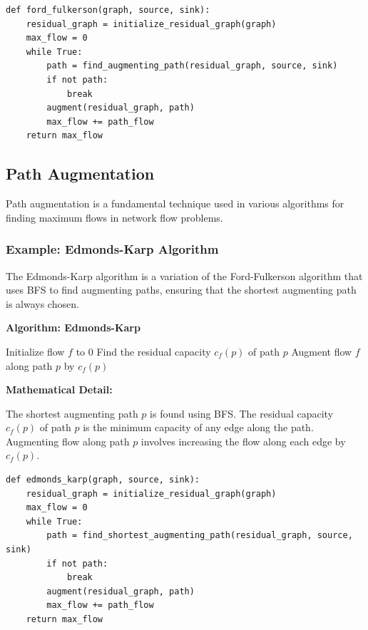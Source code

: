 \documentclass[12pt]{book} %
\begin{document}
\FloatBarrier
\begin{lstlisting}
def ford_fulkerson(graph, source, sink):
    residual_graph = initialize_residual_graph(graph)
    max_flow = 0
    while True:
        path = find_augmenting_path(residual_graph, source, sink)
        if not path:
            break
        augment(residual_graph, path)
        max_flow += path_flow
    return max_flow
\end{lstlisting}
\FloatBarrier

\subsection{Path Augmentation}

Path augmentation is a fundamental technique used in various algorithms for finding maximum flows in network flow problems.

\subsubsection{Example: Edmonds-Karp Algorithm}

The Edmonds-Karp algorithm is a variation of the Ford-Fulkerson algorithm that uses BFS to find augmenting paths, ensuring that the shortest augmenting path is always chosen.

\textbf{Algorithm: Edmonds-Karp}
\FloatBarrier
\begin{algorithm}[H]
\caption{Edmonds-Karp Algorithm}\label{alg:edmonds-karp}
\begin{algorithmic}[1]
\State Initialize flow $f$ to 0
    \State Find the residual capacity $c_f(p)$ of path $p$
    \State Augment flow $f$ along path $p$ by $c_f(p)$
\EndWhile
\end{algorithmic}
\end{algorithm}
\FloatBarrier
\textbf{Mathematical Detail:}

The shortest augmenting path $p$ is found using BFS. The residual capacity $c_f(p)$ of path $p$ is the minimum capacity of any edge along the path. Augmenting flow along path $p$ involves increasing the flow along each edge by $c_f(p)$.

\FloatBarrier
\begin{lstlisting}
def edmonds_karp(graph, source, sink):
    residual_graph = initialize_residual_graph(graph)
    max_flow = 0
    while True:
        path = find_shortest_augmenting_path(residual_graph, source, sink)
        if not path:
            break
        augment(residual_graph, path)
        max_flow += path_flow
    return max_flow
\end{lstlisting}
\FloatBarrier
\end{document}

